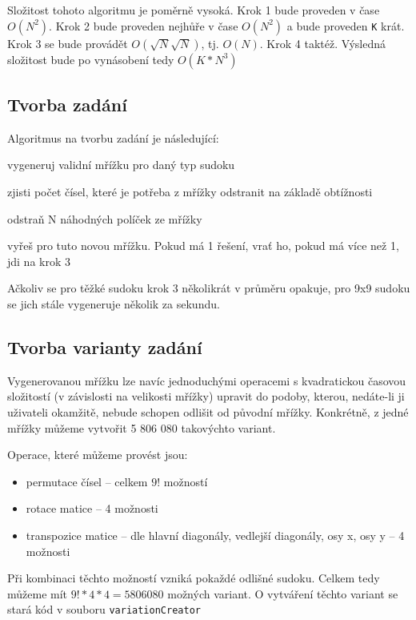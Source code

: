 \documentclass[a4paper,oneside,12pt]{report}
\begin{document}
Složitost tohoto algoritmu je poměrně vysoká. Krok 1 bude proveden v čase $O(N^{2})$. Krok 2 bude proveden nejhůře v čase $O(N^{2})$ a bude proveden \texttt{K} krát. Krok 3 se bude provádět $O(\sqrt{N} \sqrt{N})$, tj. $O(N)$. Krok 4 taktéž. Výsledná složitost bude po vynásobení tedy $O(K * N^{3})$ 

\subsection{Tvorba zadání}
Algoritmus na tvorbu zadání je následující:
\begin{algEnumerate}
   \item vygeneruj validní mřížku pro daný typ sudoku
   \item zjisti počet čísel, které je potřeba z mřížky odstranit na základě obtížnosti
   \item odstraň N náhodných políček ze mřížky
   \item vyřeš pro tuto novou mřížku. Pokud má 1 řešení, vrať ho, pokud má více než 1, jdi na krok 3
\end{algEnumerate}

Ačkoliv se pro těžké sudoku krok 3 několikrát v průměru opakuje, pro 9x9 sudoku se jich stále vygeneruje několik za sekundu.

\subsection{Tvorba varianty zadání}
Vygenerovanou mřížku lze navíc jednoduchými operacemi s kvadratickou časovou složitostí (v závislosti na velikosti mřížky) upravit do podoby, kterou, nedáte-li ji uživateli okamžitě, nebude schopen odlišit od původní mřížky. Konkrétně, z jedné mřížky můžeme vytvořit 5 806 080 takovýchto variant.

Operace, které můžeme provést jsou:
\begin{itemize}
   \item permutace čísel -- celkem $9!$ možností
   \item rotace matice -- 4 možnosti
   \item transpozice matice -- dle hlavní diagonály, vedlejší diagonály, osy x, osy y -- 4 možnosti
\end{itemize}

Při kombinaci těchto možností vzniká pokaždé odlišné sudoku. Celkem tedy můžeme mít $9! * 4 * 4 = 5 806 080$ možných variant. O vytváření těchto variant se stará kód v souboru \texttt{variationCreator}
\end{document}
